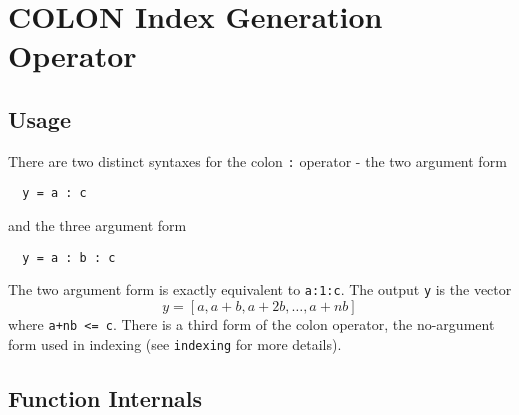 \section{COLON Index Generation Operator}

\subsection{Usage}

There are two distinct syntaxes for the colon \verb|:| operator - the two argument form
\begin{verbatim}
  y = a : c
\end{verbatim}
and the three argument form
\begin{verbatim}
  y = a : b : c
\end{verbatim}
The two argument form is exactly equivalent to \verb|a:1:c|.  The output \verb|y| is the vector
\[
  y = [a,a+b,a+2b,\ldots,a+nb]
\]
where \verb|a+nb <= c|.  There is a third form of the colon operator, the 
no-argument form used in indexing (see \verb|indexing| for more details).
\subsection{Function Internals}

